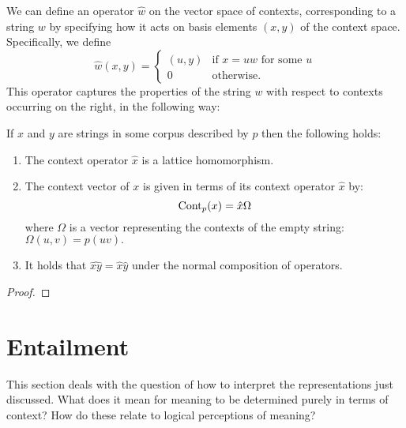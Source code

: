 We can define an operator $\hat{w}$ on the vector space of contexts, corresponding to a string $w$ by specifying how it acts on basis elements $(x,y)$ of the context space. Specifically, we define
$$\hat{w}(x,y) = \left\{ \begin{array}{ll}
(u,y) & \textrm{if $x = uw$ for some $u$}\\
0 & \textrm{otherwise.}
\end{array} \right.$$
This operator captures the properties of the string $w$ with respect to contexts occurring on the right, in the following way:
\begin{prop} If $x$ and $y$ are strings in some corpus described by $p$ then the following holds:
\begin{enumerate}[1.]
\item The context operator $\hat{x}$ is a lattice homomorphism.
\item The context vector of $x$ is given in terms of its context operator $\hat{x}$ by:
$$\mathrm{Cont}_p(x) = \hat{x}\Omega$$
where $\Omega$ is a vector representing the contexts of the empty string:
$\Omega(u,v) = p(uv).$
\item It holds that $\widehat{xy} = \hat{x}\hat{y}$ under the normal composition of operators.
\end{enumerate}
\end{prop}

\begin{proof}

\end{proof}

\section{Entailment}

This section deals with the question of how to interpret the representations just discussed. What does it mean for meaning to be determined purely in terms of context? How do these relate to logical perceptions of meaning?

